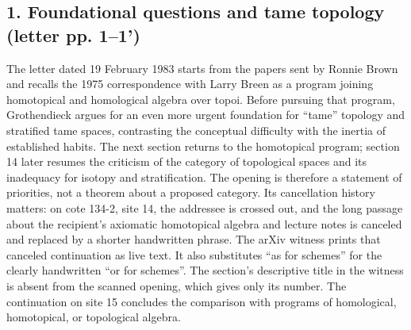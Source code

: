 \subsection*{1. Foundational questions and tame topology (letter pp. 1--1')}
The letter dated 19 February 1983 starts from the papers sent by Ronnie Brown and recalls the 1975 correspondence with Larry Breen as a program joining homotopical and homological algebra over topoi. Before pursuing that program, Grothendieck argues for an even more urgent foundation for ``tame'' topology and stratified tame spaces, contrasting the conceptual difficulty with the inertia of established habits. The next section returns to the homotopical program; section 14 later resumes the criticism of the category of topological spaces and its inadequacy for isotopy and stratification. The opening is therefore a statement of priorities, not a theorem about a proposed category. Its cancellation history matters: on cote 134-2, site 14, the addressee is crossed out, and the long passage about the recipient's axiomatic homotopical algebra and lecture notes is canceled and replaced by a shorter handwritten phrase. The arXiv witness prints that canceled continuation as live text. It also substitutes ``as for schemes'' for the clearly handwritten ``or for schemes''. The section's descriptive title in the witness is absent from the scanned opening, which gives only its number. The continuation on site 15 concludes the comparison with programs of homological, homotopical, or topological algebra.

